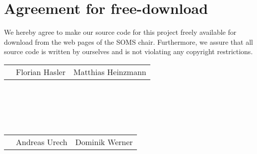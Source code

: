 \documentclass[11pt]{article}
\begin{document}

\newpage


\newpage
\section*{Agreement for free-download}
\bigskip


\bigskip


\large We hereby agree to make our source code for this project freely available for download from the web pages of the SOMS chair. Furthermore, we assure that all source code is written by ourselves and is not violating any copyright restrictions.

\begin{center}

\bigskip


\bigskip


\begin{tabular}{@{}p{3.3cm}@{}p{6cm}@{}@{}p{6cm}@{}}
\begin{minipage}{3cm}

\end{minipage}
&
\begin{minipage}{6cm}
\vspace{2mm} \large Florian Hasler

 \vspace{\baselineskip}

\end{minipage}
&
\begin{minipage}{6cm}

\large Matthias Heinzmann

\end{minipage}
\end{tabular}
%
\ \\
\ \\
\ \\
\ \\
\begin{tabular}{@{}p{3.3cm}@{}p{6cm}@{}@{}p{6cm}@{}}
\begin{minipage}{3cm}

\end{minipage}
&
\begin{minipage}{6cm}
\vspace{2mm} \large Andreas Urech

 \vspace{\baselineskip}

\end{minipage}
&
\begin{minipage}{6cm}

\large Dominik Werner

\end{minipage}
\end{tabular}


\end{center}
\newpage
\end{document}
